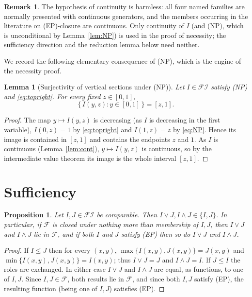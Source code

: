 \documentclass{amsart}
\theoremstyle{plain}
\newtheorem{lemma}{Lemma}
\newtheorem{proposition}{Proposition}
\theoremstyle{definition}
\newtheorem{remark}{Remark}
\newcommand{\FI}{\mathcal{FI}}
\newcommand{\Fcal}{\mathcal{F}}
\begin{document}
\begin{remark}
The hypothesis of continuity is harmless: all four named families are normally presented
with continuous generators, and the members occurring in the literature on
(EP)-closure are continuous. Only continuity of $I$ (and (NP), which is unconditional by
Lemma~\ref{lem:NP}) is used in the proof of necessity; the sufficiency direction and the
reduction lemma below need neither.
\end{remark}

We record the following elementary consequence of (NP), which is the engine of the
necessity proof.

\begin{lemma}[Surjectivity of vertical sections under (NP)]\label{lem:surj}
Let $I\in\FI$ satisfy \textup{(NP)} and \eqref{eq:topright}. For every fixed $z\in[0,1]$,
\[
\{\,I(y,z):y\in[0,1]\,\}=[z,1].
\]
\end{lemma}

\begin{proof}
The map $y\mapsto I(y,z)$ is decreasing (as $I$ is decreasing in the first variable),
$I(0,z)=1$ by \eqref{eq:topright} and $I(1,z)=z$ by \eqref{eq:NP}. Hence its image is
contained in $[z,1]$ and contains the endpoints $z$ and $1$. As $I$ is continuous
(Lemma~\ref{lem:cont}), $y\mapsto I(y,z)$ is continuous, so by the intermediate value
theorem its image is the whole interval $[z,1]$.
\end{proof}

\section{Sufficiency}

\begin{proposition}\label{prop:suff}
Let $I,J\in\FI$ be comparable. Then $I\vee J,I\wedge J\in\{I,J\}$. In particular, if
$\Fcal$ is closed under nothing more than membership of $I,J$, then $I\vee J$ and
$I\wedge J$ lie in $\Fcal$, and if both $I$ and $J$ satisfy \textup{(EP)} then so do
$I\vee J$ and $I\wedge J$.
\end{proposition}

\begin{proof}
If $I\le J$ then for every $(x,y)$, $\max\{I(x,y),J(x,y)\}=J(x,y)$ and
$\min\{I(x,y),J(x,y)\}=I(x,y)$; thus $I\vee J=J$ and $I\wedge J=I$. If $J\le I$ the
roles are exchanged. In either case $I\vee J$ and $I\wedge J$ are equal, as functions, to
one of $I,J$. Since $I,J\in\Fcal$, both results lie in $\Fcal$, and since both $I,J$
satisfy (EP), the resulting function (being one of $I,J$) satisfies (EP).
\end{proof}
\end{document}
